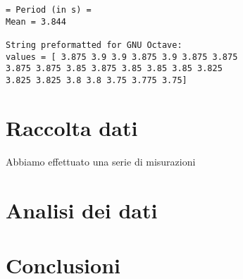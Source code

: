 \documentclass[a4paper,10pt]{report}
\begin{document}
\begin{verbatim}
= Period (in s) =
Mean = 3.844

String preformatted for GNU Octave:
values = [ 3.875 3.9 3.9 3.875 3.9 3.875 3.875
3.875 3.875 3.85 3.875 3.85 3.85 3.85 3.825
3.825 3.825 3.8 3.8 3.75 3.775 3.75]
\end{verbatim}


\section{Raccolta dati}
Abbiamo effettuato una serie di misurazioni 
\section{Analisi dei dati}
\section{Conclusioni}
\end{document}
